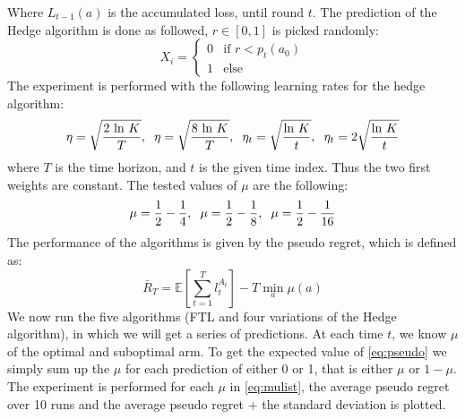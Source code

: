\documentclass{article}
\begin{document}
Where $L_{t-1}(a)$ is the accumulated loss, until round $t$.
The prediction of the Hedge algorithm is done as followed, $r \in [0,1]$ is picked randomly:
\begin{equation}
X_i = \begin{cases}
0 &\text{if $r < p_t(a_0)$}\\
1 &\text{else}
\end{cases}
\end{equation}
The experiment is performed with the following learning rates for the hedge algorithm:
\begin{equation}
\eta = \sqrt{\dfrac{2 \text{ ln } K}{T}}, \hspace{0.2cm} \eta = \sqrt{\dfrac{8 \text{ ln } K}{T}}, \hspace{0.2cm} \eta_t = \sqrt{\dfrac{\text{ln }K}{t}}, \hspace{0.2cm} \eta_t = 2\sqrt{\dfrac{\text{ln }K}{t}}
\end{equation}
where $T$ is the time horizon, and $t$ is the given time index. Thus the two first weights are constant. The tested values of $\mu$ are the following:
\begin{equation}
\label{eq:mulist}
\mu = \dfrac{1}{2} - \dfrac{1}{4}, \hspace{0.2cm} \mu = \dfrac{1}{2} - \dfrac{1}{8}, \hspace{0.2cm} \mu = \dfrac{1}{2} - \dfrac{1}{16}
\end{equation}
The performance of the algorithms is given by the pseudo regret, which is defined as:
\begin{equation}
\label{eq:pseudo}
\bar{R}_T = \mathbb{E}\left[  \sum\limits_{t=1}^T l_t^{A_t} \right] - T \min_{a} \mu(a)
\end{equation}
We now run the five algorithms (FTL and four variations of the Hedge algorithm), in which we will get a series of predictions. At each time $t$, we know $\mu$ of the optimal and suboptimal arm. To get the expected value of \eqref{eq:pseudo} we simply sum up the $\mu$ for each prediction of either 0 or 1, that is either $\mu$ or $1-\mu$. The experiment is performed for each $\mu$ in \eqref{eq:mulist}, the average pseudo regret over 10 runs and the average pseudo regret + the standard deviation is plotted.
\end{document}
